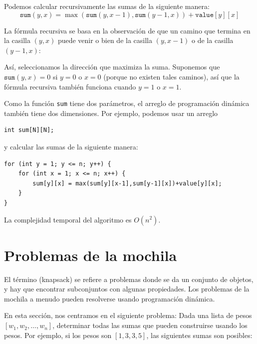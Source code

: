 Podemos calcular recursivamente las sumas
de la siguiente manera:
\[ \texttt{sum}(y,x) = \max(\texttt{sum}(y,x-1),\texttt{sum}(y-1,x))+\texttt{value}[y][x]\]


La fórmula recursiva se basa en la observación
de que un camino que termina en la casilla $(y,x)$
puede venir o bien de la casilla $(y,x-1)$
o de la casilla $(y-1,x)$:
\begin{center}
\end{center}

Así, seleccionamos la dirección que maximiza
la suma.
Suponemos que $\texttt{sum}(y,x)=0$
si $y=0$ o $x=0$ (porque no existen tales caminos),
así que la fórmula recursiva también funciona cuando $y=1$ o $x=1$.

Como la función \texttt{sum} tiene dos parámetros,
el arreglo de programación dinámica también tiene dos dimensiones.
Por ejemplo, podemos usar un arreglo
\begin{lstlisting}
int sum[N][N];
\end{lstlisting}
y calcular las sumas de la siguiente manera:
\begin{lstlisting}
for (int y = 1; y <= n; y++) {
    for (int x = 1; x <= n; x++) {
        sum[y][x] = max(sum[y][x-1],sum[y-1][x])+value[y][x];
    }
}
\end{lstlisting}
La complejidad temporal del algoritmo es $O(n^2)$.

\section{Problemas de la mochila}


El término  (knapsack) se refiere a problemas donde
se da un conjunto de objetos, y
hay que encontrar subconjuntos con algunas
propiedades.
Los problemas de la mochila a menudo pueden resolverse
usando programación dinámica.

En esta sección, nos centramos en el siguiente
problema: Dada una lista de pesos
$[w_1,w_2,\ldots,w_n]$,
determinar todas
las sumas que pueden construirse usando los pesos.
Por ejemplo, si los pesos son
$[1,3,3,5]$, las siguientes sumas son posibles:

